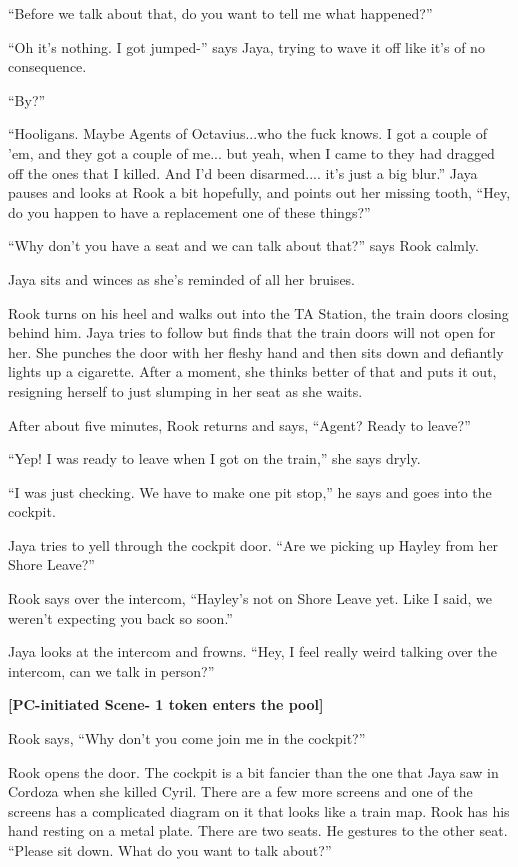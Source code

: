 ``Before we talk about that, do you want to tell me what happened?''

``Oh it's nothing.  I got jumped-'' says Jaya, trying to wave it off like it's of no consequence.

``By?''

``Hooligans.  Maybe Agents of Octavius...who the fuck knows.  I got a couple of 'em, and they got a couple of me... but yeah, when I came to they had dragged off the ones that I killed.  And I'd been disarmed.... it's just a big blur.''  Jaya pauses and looks at Rook a bit hopefully, and points out her missing tooth, ``Hey, do you happen to have a replacement one of these things?''

``Why don't you have a seat and we can talk about that?'' says Rook calmly.

Jaya sits and winces as she's reminded of all her bruises.

Rook turns on his heel and walks out into the TA Station, the train doors closing behind him.  Jaya tries to follow but finds that the train doors will not open for her.  She punches the door with her fleshy hand and then sits down and defiantly lights up a cigarette.  After a moment, she thinks better of that and puts it out, resigning herself to just slumping in her seat as she waits.



After about five minutes, Rook returns and says, ``Agent?  Ready to leave?''

``Yep!  I was ready to leave when I got on the train,'' she says dryly.

``I was just checking.  We have to make one pit stop,'' he says and goes into the cockpit.

Jaya tries to yell through the cockpit door.  ``Are we picking up Hayley from her Shore Leave?''

Rook says over the intercom, ``Hayley's not on Shore Leave yet.  Like I said, we weren't expecting you back so soon.''

Jaya looks at the intercom and frowns.  ``Hey, I feel really weird talking over the intercom, can we talk in person?''

\textbf{{[}PC-initiated Scene- 1 token enters the pool{]}}



Rook says, ``Why don't you come join me in the cockpit?''

Rook opens the door.  The cockpit is a bit fancier than the one that Jaya saw in Cordoza when she killed Cyril.  There are a few more screens and one of the screens has a complicated diagram on it that looks like a train map.  Rook has his hand resting on a metal plate.  There are two seats.  He gestures to the other seat.  ``Please sit down.  What do you want to talk about?''

